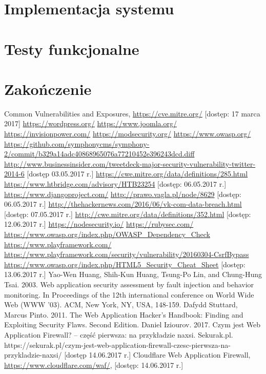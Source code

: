 \documentclass[11pt,a4paper,polish,thesis,oneside]{dcsbook}
\begin{document}
\chapter{Implementacja systemu}

\chapter{Testy funkcjonalne}


\chapter{Zakończenie}

\backmatter

\begin{thebibliography}{1}
 Common Vulnerabilities and Exposures, \url{https://cve.mitre.org/} [dostęp: 17 marca 2017]
 \url{https://wordpress.org/}
 \url{https://www.joomla.org/}
 \url{https://invisionpower.com/}
 \url{https://modsecurity.org/}
\url{ https://www.owasp.org/}
 \url{https://github.com/symphonycms/symphony-2/commit/b329a14adc40868965076a77210452e396243dcd.diff}
 \url{http://www.businessinsider.com/tweetdeck-major-security-vulnerability-twitter-2014-6} [dostęp 03.05.2017 r.]
 \url{https://cwe.mitre.org/data/definitions/285.html}
 \url{https://www.htbridge.com/advisory/HTB23254} [dostęp: 06.05.2017 r.]
 \url{https://www.djangoproject.com/}
 \url{http://prawo.vagla.pl/node/8629} [dostęp: 06.05.2017 r.]
 \url{http://thehackernews.com/2016/06/vk-com-data-breach.html} [dostęp: 07.05.2017 r.]
 \url{http://cwe.mitre.org/data/definitions/352.html} [dostęp: 12.06.2017 r.]
 \url{https://nodesecurity.io/}
 \url{https://rubysec.com/}
 \url{https://www.owasp.org/index.php/OWASP\_Dependency\_Check}
 \url{https://www.playframework.com/}
 \url{https://www.playframework.com/security/vulnerability/20160304-CsrfBypass}
 \url{https://www.owasp.org/index.php/HTML5\_Security\_Cheat\_Sheet} [dostęp: 13.06.2017 r.]
 Yao-Wen Huang, Shih-Kun Huang, Tsung-Po Lin, and Chung-Hung Tsai. 2003. Web application security assessment by fault injection and behavior monitoring. In Proceedings of the 12th international conference on World Wide Web (WWW '03). ACM, New York, NY, USA, 148-159.
 Dafydd Stuttard, Marcus Pinto. 2011. The Web Application Hacker's Handbook: Finding and Exploiting Security Flaws. Second Edition.
 Daniel Iziourov. 2017. Czym jest Web Application Firewall? – część pierwsza: na przykładzie naxsi. Sekurak.pl. https://sekurak.pl/czym-jest-web-application-firewall-czesc-pierwsza-na-przykladzie-naxsi/ [dostęp 14.06.2017 r.]
 Cloudflare Web Application Firewall, \url{https://www.cloudflare.com/waf/}, [dostęp: 14.06.2017 r.]
\end{thebibliography}
\end{document}
